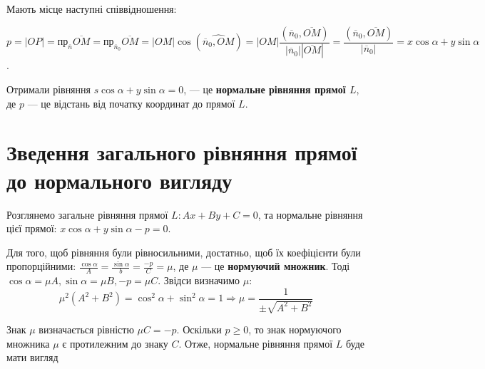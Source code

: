 \noindent\parbox{3.7cm}{}
\parbox{\textwidth - 3.8cm}{
	Мають місце наступні співвідношення:

	$p = |OP|
	= \text{пр}_{\overline{n}}\overline{OM} = \text{пр}_{\overline{n}_0}\overline{OM}
	= |OM|\cos(\widehat{\overline{n}_0,OM})
	= |OM|\dfrac{(\overline{n}_0,\overline{OM})}{|\overline{n}_0||\overline{OM}|}
	= \dfrac{(\overline{n}_0,\overline{OM})}{|\overline{n}_0|}
	= x\cos\alpha + y\sin\alpha$.
	
	Отримали рівняння
	$s\cos\alpha + y\sin\alpha = 0$,	
	--- це \textbf{нормальне рівняння прямої $L$}, де $p$ --- це відстань від початку
	координат до прямої $L$.
}

\parbox{\textwidth - 0.6cm}{\section{Зведення загального рівняння прямої до нормального вигляду}}

Розглянемо загальне рівняння прямої $L: Ax + By + C= 0$, та нормальне
рівняння цієї прямої: $x\cos\alpha + y\sin\alpha - p = 0$.

Для того, щоб рівняння були рівносильними, достатньо, щоб їх коефіцієнти
були пропорційними: $\frac{\cos\alpha}{A} = \frac{\sin\alpha}{b} = \frac{-p}{C} = \mu$, де $\mu$ --- це
\textbf{нормуючий множник}. Тоді $\cos\alpha = \mu A, \sin\alpha = \mu B, -p = \mu C$. Звідси визначимо $\mu$:
$$\mu^2(A^2 + B^2) = \cos^2\alpha + \sin^2\alpha = 1 \Rightarrow \mu = \dfrac{1}{\pm\sqrt{A^2 + B^2}}$$

Знак $\mu$ визначається рівністю $\mu C = -p$. Оскільки $p \geq 0$, то знак нормуючого
множника $\mu$ є протилежним до знаку $C$. Отже, нормальне рівняння прямої $L$ буде
мати вигляд

